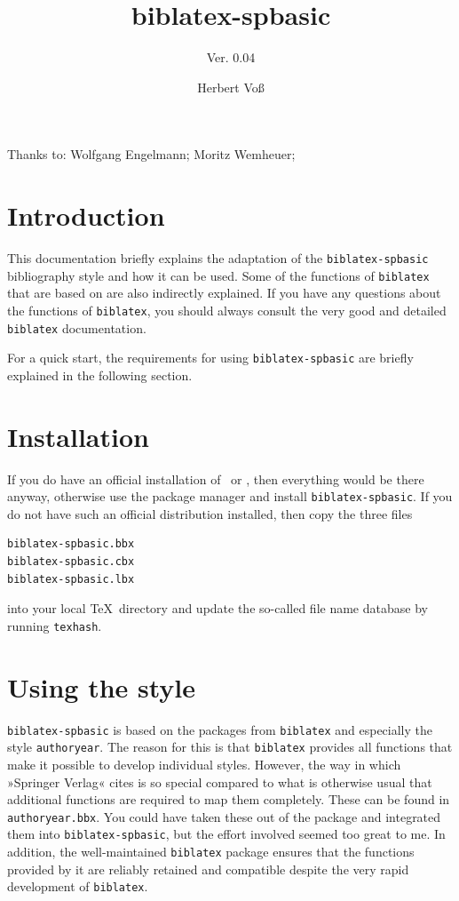 \documentclass[toc=graduated,parskip=half-,DIV=13,fontsize=11pt,paper=a4]{scrartcl}
\begin{document}
\title{biblatex-spbasic}
\subtitle{Ver. 0.04}
\author{Herbert Voß}

\maketitle

\vfill
Thanks to: Wolfgang Engelmann; Moritz Wemheuer;
\newpage

\section{Introduction}
This documentation briefly explains the adaptation of the \texttt{biblatex-spbasic}
bibliography style and how it can be used. Some of the functions of \texttt{biblatex} 
that are based on are also indirectly explained. If you have any questions about the 
functions of \texttt{biblatex}, you should always consult the very good and detailed 
\texttt{biblatex} documentation. 

For a quick start, the requirements for using \texttt{biblatex-spbasic} are briefly explained in the following section.


\section{Installation}

If you do have an official installation of \MiKTeX\ or \TeXLive, then everything would be there anyway, otherwise
use the package manager and install \texttt{biblatex-spbasic}. If you do not have such an official distribution
installed, then copy the three files

\begin{verbatim}
biblatex-spbasic.bbx
biblatex-spbasic.cbx
biblatex-spbasic.lbx
\end{verbatim}

into your local \TeX\ directory and update the so-called file name database by running \texttt{texhash}.

\section{Using the style}

\texttt{biblatex-spbasic} is based on the packages from \texttt{biblatex} and especially the style \texttt{authoryear}. 
The reason for this is that \texttt{biblatex} provides all functions that make it possible to develop individual 
styles. However, the way in which »Springer Verlag« cites is so special compared to what is otherwise usual 
that additional functions are required to map them completely. These can be found in \texttt{authoryear.bbx}. 
You could have taken these out of the package and integrated them into \texttt{biblatex-spbasic}, but the 
effort involved seemed too great to me. In addition, the well-maintained \texttt{biblatex} package ensures 
that the functions provided by it are reliably retained and compatible despite the very rapid development of \texttt{biblatex}.
\end{document}
